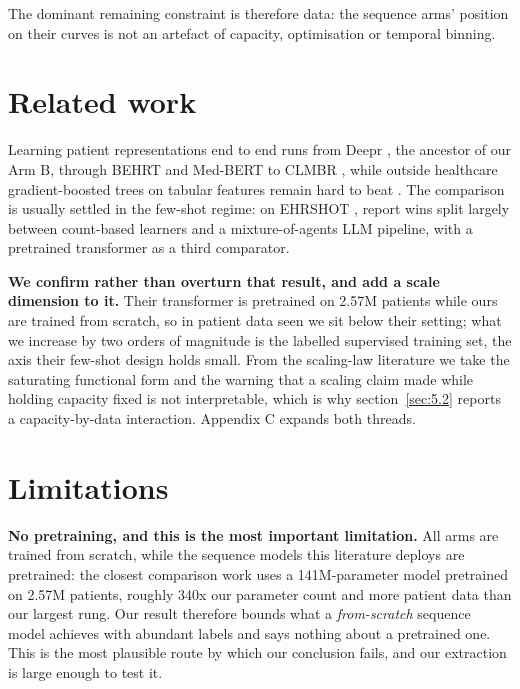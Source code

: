 \documentclass[10pt,twocolumn,letterpaper]{article}
\begin{document}
The dominant remaining constraint is therefore data: the sequence arms' position on their curves is not an artefact of capacity, optimisation or temporal binning.



\section{Related work}\label{sec:6}



Learning patient representations end to end runs from Deepr \citep{nguyen2017deepr}, the ancestor of our Arm B, through BEHRT \citep{li2020behrt} and Med-BERT \citep{rasmy2021medbert} to CLMBR \citep{steinberg2021clmbr}, while outside healthcare gradient-boosted trees on tabular features remain hard to beat \citep{shwartzziv2022tabular,grinsztajn2022trees}. The comparison is usually settled in the few-shot regime: on EHRSHOT \citep{wornow2023ehrshot}, \citet{gao2025countbased} report wins split largely between count-based learners and a mixture-of-agents LLM pipeline, with a pretrained transformer as a third comparator.



\textbf{We confirm rather than overturn that result, and add a scale dimension to it.} Their transformer is pretrained on 2.57M patients while ours are trained from scratch, so in patient data seen we sit below their setting; what we increase by two orders of magnitude is the labelled supervised training set, the axis their few-shot design holds small. From the scaling-law literature \citep{hestness2017scaling,rosenfeld2020constructive,kaplan2020scaling,hoffmann2022training} we take the saturating functional form and the warning that a scaling claim made while holding capacity fixed is not interpretable, which is why section~\ref{sec:5.2} reports a capacity-by-data interaction. Appendix C expands both threads.







\section{Limitations}\label{sec:7}



\textbf{No pretraining, and this is the most important limitation.} All arms are trained from scratch, while the sequence models this literature deploys are pretrained: the closest comparison work uses a 141M-parameter model pretrained on 2.57M patients, roughly 340x our parameter count and more patient data than our largest rung. Our result therefore bounds what a \emph{from-scratch} sequence model achieves with abundant labels and says nothing about a pretrained one. This is the most plausible route by which our conclusion fails, and our extraction is large enough to test it.
\end{document}
